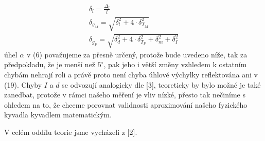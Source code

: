 \documentclass{article}
\begin{document}
\begin{align}
\delta_{l} =\frac{\Delta_{l}}{l} \\
\delta_{g_{M}} = \sqrt{\delta_{l}^{2} + 4\cdot \delta_{T_{M}}^{2}} \\
\delta_{g_{F}} = \sqrt{\delta_{d}^{2} + 4\cdot \delta_{T_{F}}^{2} + \delta_{m}^{2} + \delta_{I}^{2}}
\end{align}
úhel $\alpha$ v (6) považujeme za přesně určený, protože bude uvedeno níže, tak za předpokladu, že je menší než $5^{\circ}$, pak jeho i větší změny vzhledem k ostatním chybám nehrají roli a právě proto není chyba úhlové výchylky reflektována ani v (19). Chyby $I$ a $d$ se odvozují analogicky dle [3], teoreticky by bylo možné je také zanedbat, protože v rámci našeho měření je vliv nízké, přesto tak nečiníme s ohledem na to, že chceme porovnat validnosti aproximování našeho fyzického kyvadla kyvadlem matematickým.
\par V celém oddílu teorie jsme vycházeli z [2].
\end{document}
